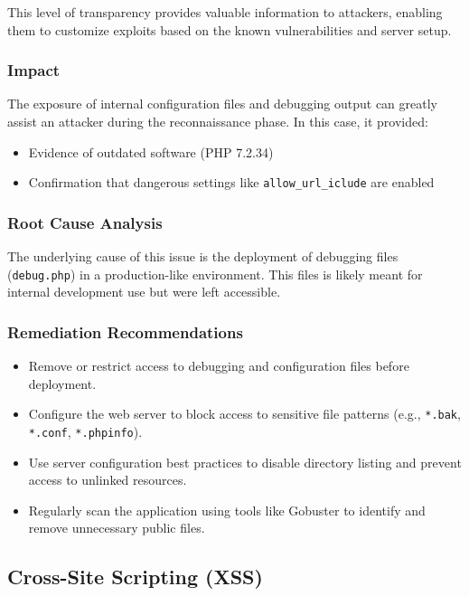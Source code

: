\documentclass[12pt]{article}
\begin{document}
\begin{itemize}
    \FloatBarrier
\end{itemize}

This level of transparency provides valuable information to attackers, enabling them to customize exploits based on the known vulnerabilities and server setup.


\subsubsection{Impact}
The exposure of internal configuration files and debugging output can greatly assist an attacker during the reconnaissance phase. In this case, it provided:

\begin{itemize}
    \item Evidence of outdated software (PHP 7.2.34) \cite{cvedetails-php7234}
    \item Confirmation that dangerous settings like \texttt{allow\_url\_iclude} are enabled \cite{php-ini-secure}
\end{itemize}

\subsubsection{Root Cause Analysis}
The underlying cause of this issue is the deployment of debugging files (\texttt{debug.php}) in a production-like environment. This files is likely meant for internal development use but were left accessible.

\subsubsection{Remediation Recommendations}
\begin{itemize}
    \item Remove or restrict access to debugging and configuration files before deployment.
    \item Configure the web server to block access to sensitive file patterns (e.g., \texttt{*.bak}, \texttt{*.conf}, \texttt{*.phpinfo}).
    \item Use server configuration best practices to disable directory listing and prevent access to unlinked resources.
    \item Regularly scan the application using tools like Gobuster to identify and remove unnecessary public files.
\end{itemize}

\subsection{Cross-Site Scripting (XSS)}
\end{document}
